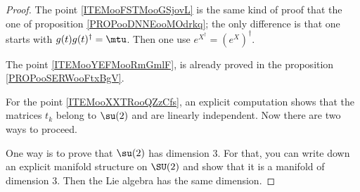 \begin{proof}
	The point \ref{ITEMooFSTMooGSjovL} is the same kind of proof that the one of proposition \ref{PROPooDNNEooMOdrkq}; the only difference is that one starts with \( g(t)g(t)^{\dag}=\mtu\). Then one use \(  e^{X^{\dag}}=( e^{X})^{\dag}\).

	The point \ref{ITEMooYEFMooRmGmlF}, is already proved in the proposition \ref{PROPooSERWooFtxBgV}.

	For the point \ref{ITEMooXXTRooQZzCfs}, an explicit computation shows that the matrices \( t_k\) belong to \( \su(2)\) and are linearly independent. Now there are two ways to proceed.

	One way is to prove that \( \su(2)\) has dimension \( 3\). For that, you can write down an explicit manifold structure on \( \SU(2)\) and show that it is a manifold of dimension \( 3\). Then the Lie algebra has the same dimension.


\end{proof}
